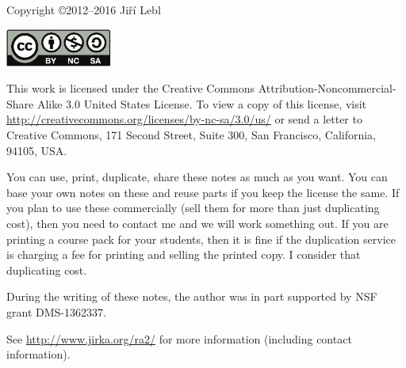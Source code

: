 \documentclass[12pt]{book}
\theoremstyle{plain}
\theoremstyle{remark}
\theoremstyle{definition}
\theoremstyle{exercise}
\theoremstyle{example}
\begin{document}
\bigskip

\noindent
Copyright \copyright 2012--2016 Ji{\v r}\'i Lebl

\bigskip

\noindent
\includegraphics[width=1.38in]{figures/license}

\bigskip

\noindent
This work is licensed under the Creative Commons
Attribution-Non\-commercial-Share Alike 3.0 United States License. To view a
copy of this license, visit
\url{http://creativecommons.org/licenses/by-nc-sa/3.0/us/} or send a letter to
Creative Commons, 171 Second Street, Suite 300, San Francisco, California,
94105, USA.

\bigskip

\noindent
You can use, print, duplicate, share these notes as much as you want.  You can
base your own notes on these and reuse parts if you keep the license the
same.  If you plan to use these commercially (sell them for more than just
duplicating cost), then you need to contact me and we will work something out.
If you are printing a course pack for your students, then it is fine if the 
duplication service is charging a fee for printing and selling the printed
copy.  I consider that duplicating cost.

\bigskip

\noindent
During the writing of these notes, 
the author was in part supported by NSF grant DMS-1362337.

\bigskip

\noindent
See \url{http://www.jirka.org/ra2/} for more information
(including contact information).



\tableofcontents
{}

\newpage

\end{document}

